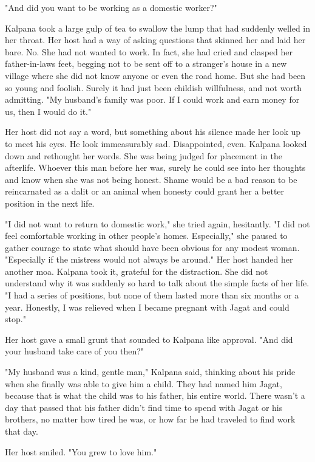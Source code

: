 \documentclass{amsart}
\begin{document}
	"And did you want to be working as a domestic worker?"
	
	Kalpana took a large gulp of tea to swallow the lump that had suddenly welled in
	her throat. Her host had a way of asking questions that skinned her and laid her 
	bare. No. She had not wanted to work. In fact, she had cried and clasped her father-in-laws feet,
	begging not to be sent off to a stranger's house in a new village where she did
	not know anyone or even the road home. But she had been so young and foolish. Surely
	it had just been childish willfulness, and not worth admitting. "My husband's family 
	was poor. If I could work and earn money for us, then I would do it."
	
	Her host did not say a word, but something about his silence made her look up to
	meet his eyes. He look immeasurably sad. Disappointed, even. Kalpana looked down
	and rethought her words. She was being judged for placement in the afterlife.
	Whoever this man before her was, surely he could see into her thoughts and know
	when she was not being honest. Shame would be a bad reason to be reincarnated as
	a dalit or an animal when honesty could grant her a better position in the next
	life.
	
	"I did not want to return to domestic work," she tried again, hesitantly. "I did
	not feel comfortable working in other people's homes. Especially," she paused to
	gather courage to state what should have been obvious for any modest woman.
	"Especially if the mistress would not always be around." Her host handed her
	another moa. Kalpana took it, grateful for the distraction. She did not
	understand why it was suddenly so hard to talk about the simple facts of her
	life. "I had a series of positions, but none of them lasted more than six months
	or a year. Honestly, I was relieved when I became pregnant with Jagat and could
	stop."
	
	Her host gave a small grunt that sounded to Kalpana like approval. "And did your
	husband take care of you then?"
	
	"My husband was a kind, gentle man," Kalpana said, thinking about his pride when
	she finally was able to give him a child. They had named him Jagat, because that
	is what the child was to his father, his entire world. There wasn't a day that
	passed that his father didn't find time to spend with Jagat or his brothers, no
	matter how tired he was, or how far he had traveled to find work that day.
	
	Her host smiled. "You grew to love him."
	
\end{document}

